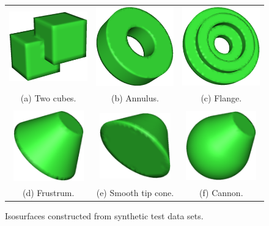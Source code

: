
\begin{figure}
\centering
\begin{tabular}{ccc}
\includegraphics[width=1.5in]{images/twocubes.eps} \qquad &
\qquad
\includegraphics[width=1.5in]{images/annulus.eps}
\qquad &
\includegraphics[width=1.5in]{images/flange.eps} \\

(a) Two cubes. & (b) Annulus. & (c) Flange. \\
\\
\includegraphics[width=1.2in]{images/frustrum.eps} \qquad &
\qquad
\includegraphics[width=1.2in]{images/smooth_tip_cone.eps} 
\qquad &
\qquad
\includegraphics[width=1.2in]{images/cannon_iso.eps} \\
(d) Frustrum. & (e) Smooth tip cone. & (f) Cannon.
\end{tabular}
\caption{Isosurfaces constructed from synthetic test data sets.}
\label{fig:synthetic_data}
\end{figure}

